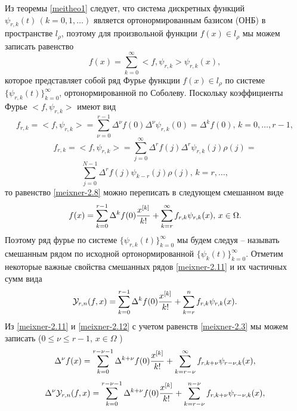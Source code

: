 Из теоремы \eqref{meitheo1} следует, что система дискретных функций $\psi_{r,k}(t)\, (k=0,1,\ldots)$
является ортонормированным базисом (ОНБ) в пространстве $l_\rho$, поэтому для произвольной функции $f(x)\in l_\rho$ мы можем записать равенство
  \begin{equation}\label{meixner-2.8}
 f(x)= \sum_{k=0}^\infty<f,\psi_{r,k}> \psi_{r,k}(x),
  \end{equation}
которое представляет собой  ряд Фурье функции $f(x)\in l_\rho$ по системе
$\{\psi_{r,k}(t)\}_{k=0}^\infty$, ортонормированной по Соболеву. Поскольку коэффициенты Фурье $<f,\psi_{r,k}>$ имеют  вид
\begin{equation}\label{meixner-2.9}
f_{r,k}=<f,\psi_{r,k}> =\sum_{\nu=0}^{r-1}\Delta^\nu f(0)\Delta^\nu\psi_{r,k}(0)=\Delta^kf(0),\, k=0,\ldots, r-1,
 \end{equation}
 $$
f_{r,k}= <f,\psi_{r,k}> =\sum_{j=0}^\infty\Delta^rf(j)\Delta^r\psi_{r,k}(j)\rho(j)=
 $$
\begin{equation}\label{meixner-2.10}
\sum_{j=0}^{N-1}\Delta^rf(j)\psi_{k-r}(j)\rho(j),\, k=r,\ldots,
 \end{equation}
то равенство \eqref{meixner-2.8} можно переписать в следующем  смешанном виде
  \begin{equation}\label{meixner-2.11}
 f(x)= \sum_{k=0}^{r-1}\Delta^kf(0){x^{[k]}\over k!} +\sum_{k=r}^\infty f_{r,k} \psi_{r,k}(x),\, x\in \Omega.
  \end{equation}
Поэтому ряд фурье по системе $\{\psi_{r,k}(t)\}_{k=0}^\infty$ мы будем следуя \cite{meixner-7} -- \cite{meixner-18}  называть смешанным рядом по исходной ортонормированной  $\{\psi_{k}(t)\}_{k=0}^\infty$. Отметим некоторые важные свойства смешанных рядов  \eqref{meixner-2.11} и их частичных сумм вида
\begin{equation}\label{meixner-2.12}
 \mathcal{Y}_{r,n}(f,x)= \sum_{k=0}^{r-1}\Delta^kf(0){x^{[k]}\over k!} +\sum_{k=r}^{n}f_{r,k} \psi_{r,k}(x).
  \end{equation}
Из \eqref{meixner-2.11} и \eqref{meixner-2.12} с учетом равенств \eqref{meixner-2.3} мы можем записать ($0\le\nu\le r-1$, $x\in \Omega$ )
 \begin{equation}\label{meixner-2.13}
 \Delta^\nu f(x)= \sum_{k=0}^{r-\nu-1}\Delta^{k+\nu}f(0){x^{[k]}\over k!} +\sum_{k=r-\nu}^\infty f_{r,k+\nu} \psi_{r-\nu,k}(x),
  \end{equation}
  \begin{equation}\label{meixner-2.14}
 \Delta^\nu\mathcal{Y}_{r,n}(f,x)= \sum_{k=0}^{r-\nu-1}\Delta^{k+\nu}f(0){x^{[k]}\over k!} +\sum_{k=r-\nu}^{n-\nu} f_{r,k+\nu} \psi_{r-\nu,k}(x),
  \end{equation}
